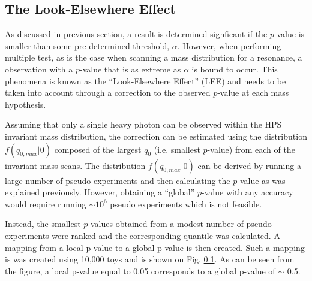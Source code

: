 \subsection{The Look-Elsewhere Effect}

As discussed in previous section, a result is determined signficant if the 
$p$-value is smaller than some pre-determined threshold, $\alpha$.  However, 
when performing multiple test, as is the case when scanning a mass distribution
for a resonance, a observation with a $p$-value that is as extreme as $\alpha$
is bound to occur.  This phenomena is known as the ``Look-Elsewhere Effect'' (LEE)
and needs to be taken into account through a correction to the observed $p$-value
at each mass hypothesis.

Assuming that only a single heavy photon can be observed within the HPS invariant
mass distribution, the correction can be estimated using the distribution 
$f(q_{0, max} | 0)$ composed of the largest $q_{0}$ (i.e. smallest $p$-value)
from each of the invariant mass scans.  The distribution $f(q_{0, max} | 0)$ can
be derived by running a large number of pseudo-experiments and then calculating
the $p$-value as was explained previously.  However, obtaining a ``global''
$p$-value with any accuracy would require running $\sim 10^{6}$ pseudo experiments
which is not feasible.  

Instead, the smallest $p$-values obtained from a modest number of pseudo-experiments were
ranked and the corresponding quantile was calculated.  A mapping from a local 
p-value to a global p-value is then created.  Such a mapping is was created using
10,000 toys and is shown on Fig. \ref{}.  As can be seen from the figure, a 
local p-value equal to 0.05 corresponds to a global p-value of $\sim$ 0.5.



 

